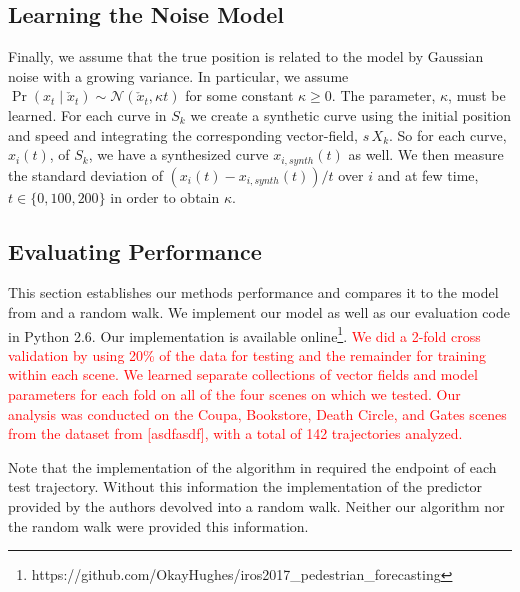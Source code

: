 \documentclass[letterpaper,10pt,conference]{ieeeconf}
\newcommand{\rtext}[1]{\textcolor{red}{#1}}
\begin{document}
  \subsection{Learning the Noise Model}
  Finally, we assume that the true position is related to the model by Gaussian noise with a growing variance.
  In particular, we assume $\Pr( x_t \mid \check{x}_t) \sim \mathcal{N}( \check{x}_t , \kappa t)$ for some constant $\kappa \geq 0$.
  The parameter, $\kappa$, must be learned.
  For each curve in $S_k$ we create a synthetic curve using the initial position and speed and integrating the corresponding vector-field, $s\, X_k$.
  So for each curve, $x_i(t)$, of $S_k$, we have a synthesized curve $x_{i,synth}(t)$ as well.
  We then measure the standard deviation of $(x_i(t) - x_{i,synth}(t)) / t$ over $i$ and at few time, $t \in \{ 0, 100, 200 \}$ in order to obtain $\kappa$.
  
 \subsection{Evaluating Performance}
 
This section establishes our methods performance and compares it to the model from \cite{Kitani2012} and a random walk.
We implement our model as well as our evaluation code in Python 2.6. 
Our implementation is available online\footnote{https://github.com/OkayHughes/iros2017\_pedestrian\_forecasting}.
\rtext{We did a 2-fold cross validation by using 20\% of the data for testing and the remainder for training within each scene. We learned separate collections of vector fields and model parameters for each fold on all of the four scenes on which we tested.}
\rtext{Our analysis was conducted on the Coupa, Bookstore, Death Circle, and Gates scenes from the dataset from [asdfasdf], with a total of 142 trajectories analyzed.}



Note that the implementation of the algorithm in \cite{Kitani2012} required the endpoint of each test trajectory. 
Without this information the implementation of the predictor provided by the authors devolved into a random walk.
Neither our algorithm nor the random walk were provided this information.
\end{document}
